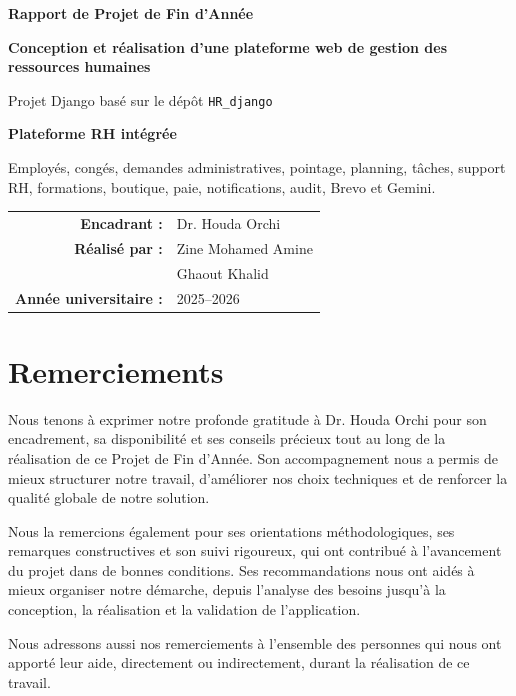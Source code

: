 \documentclass[12pt,a4paper]{report}
\begin{document}
\begin{titlepage}
\centering
\vspace*{1.2cm}
{\Large \textbf{Rapport de Projet de Fin d'Année}\par}
\vspace{1.1cm}
{\huge \textbf{Conception et réalisation d'une plateforme web de gestion des ressources humaines}\par}
\vspace{0.8cm}
{\Large Projet Django basé sur le dépôt \texttt{HR\_django}\par}
\vspace{1.1cm}
{\large \textbf{Plateforme RH intégrée}\par}
\vspace{0.25cm}
{\large Employés, congés, demandes administratives, pointage, planning, tâches, support RH, formations, boutique, paie, notifications, audit, Brevo et Gemini.\par}
\vfill
\begin{tabular}{rl}
\textbf{Encadrant :} & Dr. Houda Orchi\\[0.35cm]
\textbf{Réalisé par :} & Zine Mohamed Amine\\
& Ghaout Khalid\\[0.35cm]
\textbf{Année universitaire :} & 2025--2026
\end{tabular}
\vfill
\end{titlepage}

\chapter*{Remerciements}
Nous tenons à exprimer notre profonde gratitude à Dr. Houda Orchi pour son encadrement, sa disponibilité et ses conseils précieux tout au long de la réalisation de ce Projet de Fin d'Année. Son accompagnement nous a permis de mieux structurer notre travail, d'améliorer nos choix techniques et de renforcer la qualité globale de notre solution.

Nous la remercions également pour ses orientations méthodologiques, ses remarques constructives et son suivi rigoureux, qui ont contribué à l'avancement du projet dans de bonnes conditions. Ses recommandations nous ont aidés à mieux organiser notre démarche, depuis l'analyse des besoins jusqu'à la conception, la réalisation et la validation de l'application.

Nous adressons aussi nos remerciements à l'ensemble des personnes qui nous ont apporté leur aide, directement ou indirectement, durant la réalisation de ce travail.
\newpage
\end{document}
